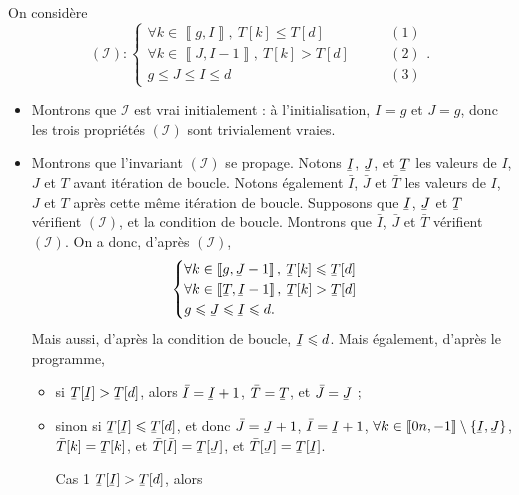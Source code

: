 \begin{prv}
	On considère \[
		(\mathcal{I}) : \begin{cases}
			\forall k \in \left\llbracket g, I \right\rrbracket,\:T[k] \le T[d]&\qquad(1)\\
			\forall k \in \left\llbracket J,I-1 \right\rrbracket,\: T[k] > T[d]&\qquad(2)\\
			g \le J \le I \le d&\qquad(3)
		\end{cases}
	.\]
	\begin{itemize}
		\item Montrons que $\mathcal{I}$\/ est vrai initialement : à l'initialisation, $I = g$\/ et $J = g$, donc les trois propriétés $(\mathcal{I})$\/ sont trivialement vraies.
		\item Montrons que l'invariant $(\mathcal{I})$\/ se propage. Notons $\ubar{I}$, $\ubar{J}$, et $\ubar{T}$\/ les valeurs de $I$, $J$\/ et $T$\/ avant itération de boucle. Notons également $\bar{I}$, $\bar{J}$\/ et $\bar{T}$\/ les valeurs de $I$, $J$\/ et $T$\/ après cette même itération de boucle. Supposons que $\ubar{I}$, $\ubar{J}$\/ et $\ubar{T}$\/ vérifient $(\mathcal{I})$, et la condition de boucle. Montrons que $\bar{I}$, $\bar{J}$\/ et $\bar{T}$\/ vérifient $(\mathcal{I})$.
			On a donc, d'après $(\mathcal{I})$, \[
				\begin{cases}
					\forall k \in \left\llbracket g, \ubar{J} - 1 \right\rrbracket,\: \ubar{T}[k] \le \ubar{T}[d]\\
					\forall k \in \left\llbracket \ubar{T}, \ubar{I}- 1 \right\rrbracket,\: \ubar{T}[k] > \ubar{T}[d]\\
					g \le \ubar{J} \le \ubar{I} \le d.
				\end{cases}
			\] Mais aussi, d'après la condition de boucle, $\ubar{I} \le d$.
			Mais également, d'après le programme,
			\begin{itemize}
				\item si $\ubar{T}[\ubar{I}] > \ubar{T}[d]$, alors $\bar{I} = \ubar{I} + 1$, $\bar{T} = \ubar{T}$, et $\bar{J} = \ubar{J}$\/ ;
				\item sinon si $\ubar{T}[\ubar{I}] \le \ubar{T}[d]$, et donc $\bar{J} = \ubar{J} + 1$, $\bar{I} = \ubar{I} + 1$, $\forall k \in \left\llbracket 0n,-1 \right\rrbracket \setminus \{\ubar{I},\ubar{J}\} $, $\bar{T}[k] = \ubar{T}[k]$, et $\bar{T}[\bar{I}] = \ubar{T}[\ubar{J}]$, et $\bar{T}[\ubar{J}] = \ubar{T}[\ubar{I}]$.
			\end{itemize}
			\begin{itemize}
				\item[{\sc Cas 1}] $\ubar{T}[\ubar{I}] > \ubar{T}[d]$, alors

\end{itemize}
\end{itemize}
\end{prv}
